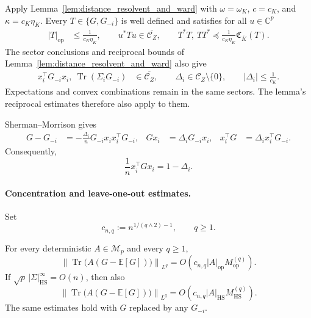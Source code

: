 \documentclass[EJP, preprint, NODS, nobera, nofontexpansion]{ejpecp}
\DeclareMathOperator{\op}{op}
\DeclareMathOperator{\tr}{Tr}
\DeclareMathOperator{\hs}{HS}
\begin{document}
Apply Lemma~\ref{lem:distance_resolvent_and_ward} with
$\omega=\omega_K$, $c=c_K$, and
$\kappa=c_K\eta_K$.
Every $T\in\{G,G_{-i}\}$ is well defined and satisfies for all $u\in\mathbb C^p$
\begin{align}\label{eq:universal_sectorial_resolvent_bounds}
 |T|_{\op}&\leq\frac1{c_K\eta_K},\qquad
 u^*Tu\in\overline{\mathcal C_Z},
 \qquad 
 T^*T,\ TT^*\preceq
 \frac1{c_K\eta_K}\mathfrak C_{\bar K}(T).
\end{align}
The sector conclusions and reciprocal bounds of
Lemma~\ref{lem:distance_resolvent_and_ward} also give
\begin{align*}
    x_i^{\top}G_{-i}x_i,\ \tr(\Sigma_iG_{-i})
    &\in\overline{\mathcal C_Z},
    \qquad 
    \Delta_i\in\mathcal C_Z\setminus\{0\},
    \qquad |\Delta_i|\leq\frac1{c_K}.
\end{align*}
Expectations and convex combinations remain in the same sectors. The lemma's reciprocal estimates therefore
also apply to them.

Sherman--Morrison gives
\begin{align}\label{eq:leave_one_out_resolvent_identities}
    G-G_{-i}
    &=
    -\frac{\Delta_i}{n}
      G_{-i}x_ix_i^{\top}G_{-i},
    &
    Gx_i&=\Delta_iG_{-i}x_i,
    &
    x_i^{\top}G&=\Delta_i x_i^{\top}G_{-i}.
\end{align}
Consequently,
\begin{equation}\label{eq:schur_pivot_trace_identity}
    \frac1n x_i^{\top}Gx_i=1-\Delta_i.
\end{equation}

\paragraph{Concentration and leave-one-out estimates.}

Set
\begin{equation}
\label{eq:def_c_nq}
    c_{n,q}:=n^{1/(q\wedge2)-1},\qquad q\geq1.
\end{equation}

\begin{proposition}
\label{pro:resolvent_concentration}
For every deterministic $A\in\mathcal M_p$ and every $q\geq1$,
\[
    \left\|
        \tr\bigl(A(G-\mathbb E[G])\bigr)
    \right\|_{L^q}
    =
    O\left(
        c_{n,q}|A|_{\op}M_{\op}^{(q)}
    \right).
\]
If $\sqrt p\,|\Sigma|_{\hs}^\infty=O(n)$, then also
\[
    \left\|
        \tr\bigl(A(G-\mathbb E[G])\bigr)
    \right\|_{L^q}
    =O\left(c_{n,q}|A|_{\hs}M_{\hs}^{(q)}\right).
\]
The same estimates hold with $G$ replaced by any $G_{-i}$.
\end{proposition}
\end{document}
